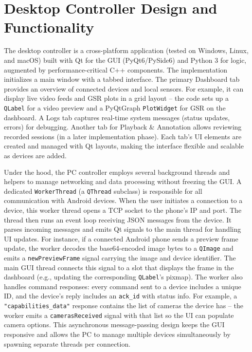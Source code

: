 \section{Desktop Controller Design and Functionality}\label{sec:4-3}
The desktop controller is a cross-platform application (tested on Windows, Linux, and macOS) built with Qt for the GUI (PyQt6/PySide6) \citep{ref17} and Python 3 for logic, augmented by performance-critical C++ components. The implementation initializes a main window with a tabbed interface. The primary Dashboard tab provides an overview of connected devices and local sensors. For example, it can display live video feeds and GSR plots in a grid layout -- the code sets up a \texttt{QLabel} for a video preview and a PyQtGraph \texttt{PlotWidget} for GSR on the dashboard. A Logs tab captures real-time system messages (status updates, errors) for debugging. Another tab for Playback \& Annotation allows reviewing recorded sessions (in a later implementation phase). Each tab's UI elements are created and managed with Qt layouts, making the interface flexible and scalable as devices are added.

Under the hood, the PC controller employs several background threads and helpers to manage networking and data processing without freezing the GUI. A dedicated \texttt{WorkerThread} (a \texttt{QThread} subclass) is responsible for all communication with Android devices. When the user initiates a connection to a device, this worker thread opens a TCP socket to the phone's IP and port. The thread then runs an event loop receiving JSON messages from the device. It parses incoming messages and emits Qt signals to the main thread for handling UI updates. For instance, if a connected Android phone sends a preview frame update, the worker decodes the base64-encoded image bytes to a \texttt{QImage} and emits a \texttt{newPreviewFrame} signal carrying the image and device identifier. The main GUI thread connects this signal to a slot that displays the frame in the dashboard (e.g., updating the corresponding \texttt{QLabel}'s pixmap). The worker also handles command responses: every command sent to a device includes a unique ID, and the device's reply includes an \texttt{ack\_id} with status info. For example, a \texttt{"capabilities\_data"} response contains the list of cameras the device has -- the worker emits a \texttt{camerasReceived} signal with that list so the UI can populate camera options. This asynchronous message-passing design keeps the GUI responsive and allows the PC to manage multiple devices simultaneously by spawning separate threads per connection.

